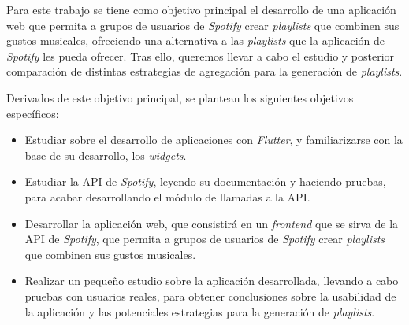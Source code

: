 Para este trabajo se tiene como objetivo principal el desarrollo de una aplicación web que permita a grupos de usuarios de \textit{Spotify}
crear \textit{playlists} que combinen sus gustos musicales, ofreciendo una alternativa a las \textit{playlists} que la aplicación de \textit{Spotify}
 les pueda ofrecer. Tras ello, queremos llevar a cabo el estudio y posterior comparación de distintas estrategias de agregación para la generación de \textit{playlists}.
 
 Derivados de este objetivo principal, se plantean los siguientes objetivos específicos:

\begin{itemize}
  \item Estudiar sobre el desarrollo de aplicaciones con \textit{Flutter}, y familiarizarse con la base de su desarrollo, los \textit{widgets}.
  \item Estudiar la API de \textit{Spotify}, leyendo su documentación y haciendo pruebas, para acabar desarrollando el módulo de llamadas a la API.
  \item Desarrollar la aplicación web, que consistirá en un \textit{frontend} que se sirva de la API de \textit{Spotify}, que permita a grupos de 
  usuarios de \textit{Spotify} crear \textit{playlists} que combinen sus gustos musicales.
  \item Realizar un pequeño estudio sobre la aplicación desarrollada, llevando a cabo pruebas con usuarios reales, para obtener conclusiones sobre 
la usabilidad de la aplicación y las potenciales estrategias para la generación de \textit{playlists}.
\end{itemize}
